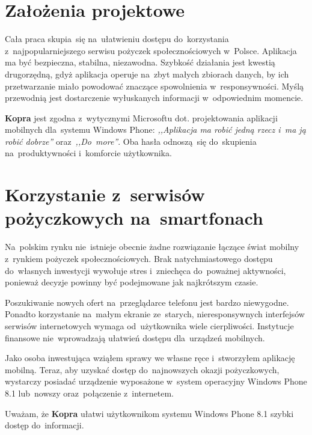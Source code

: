 \documentclass[a4paper,twoside,titlepage,openright]{book}
\begin{document}
\section*{Założenia projektowe}

Cała praca skupia~się na~ułatwieniu dostępu do~korzystania z~najpopularniejszego serwisu pożyczek społecznościowych w~Polsce. Aplikacja ma być bezpieczna, stabilna, niezawodna. Szybkość działania jest kwestią drugorzędną, gdyż aplikacja operuje na~zbyt małych zbiorach danych, by ich przetwarzanie miało powodować znaczące spowolnienia w~responsywności. Myślą przewodnią jest dostarczenie wyłuskanych informacji w~odpowiednim momencie. 

\textbf{Kopra} jest zgodna z~wytycznymi Microsoftu dot. projektowania aplikacji mobilnych dla~systemu Windows Phone: \textit{,,Aplikacja ma robić jedną rzecz i~ma ją robić dobrze''}\cite{wpDesign} oraz~\textit{,,Do~more''}\cite{doMore}. Oba hasła odnoszą~się do~skupienia na~produktywności i~komforcie użytkownika. 

\section*{Korzystanie z~serwisów pożyczkowych na~smartfonach}

Na~polskim rynku nie~istnieje obecnie żadne rozwiązanie łączące świat mobilny z~rynkiem pożyczek społecznościowych. Brak natychmiastowego dostępu do~własnych inwestycji wywołuje stres i~zniechęca do~poważnej aktywności, ponieważ decyzje powinny być podejmowane jak najkrótszym czasie. 

Poszukiwanie nowych ofert na~przeglądarce telefonu jest bardzo niewygodne. Ponadto korzystanie na~małym ekranie ze~starych, nieresponsywnych interfejsów serwisów internetowych wymaga od~użytkownika wiele cierpliwości. Instytucje finansowe nie~wprowadzają ułatwień dostępu dla~urządzeń mobilnych. 

Jako osoba inwestująca wziąłem sprawy we własne ręce i~stworzyłem aplikację mobilną. Teraz, aby uzyskać dostęp do~najnowszych okazji pożyczkowych, wystarczy posiadać urządzenie wyposażone w~system operacyjny Windows Phone 8.1 lub~nowszy oraz~połączenie z~internetem.

Uważam, że \textbf{Kopra} ułatwi użytkownikom systemu Windows Phone 8.1 szybki dostęp do~informacji.
\end{document}
